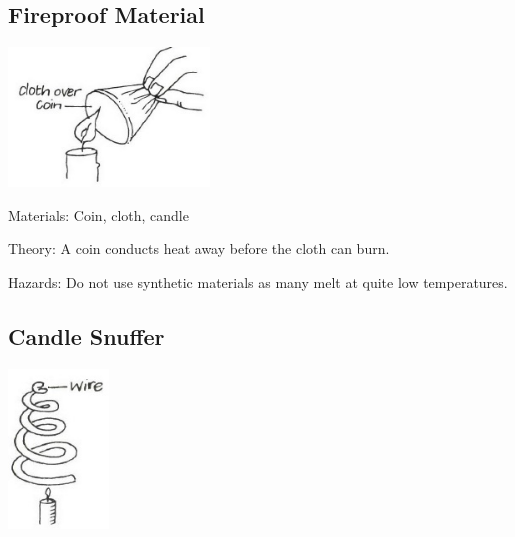 \begin{multicols}{2}
\subsection{Fireproof Material}

\begin{center}
\includegraphics[width=0.4\textwidth]{./img/vso/fireproof.jpg}
\end{center}

\begin{description*}
\item[Materials:]{Coin, cloth, candle}
\item[Theory:]{A coin conducts heat away before the cloth can burn.}
\item[Hazards:]{Do not use synthetic materials as many melt at quite low temperatures.}
\end{description*}

\subsection{Candle Snuffer}

\begin{center}
\includegraphics[width=0.2\textwidth]{./img/vso/candle-snuffer.jpg}
\end{center}


\end{multicols}
